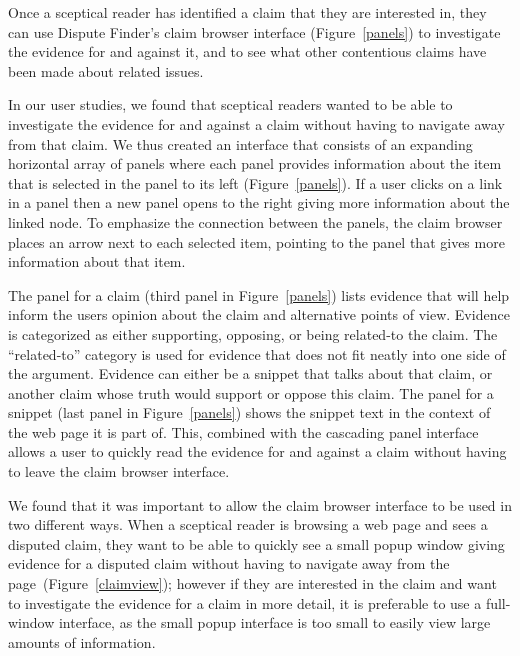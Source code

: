 \documentclass{www2010-submission}
\newcommand{\todo}[1]{}
\begin{document}
Once a sceptical reader has identified a claim that they are interested in, they can use Dispute Finder's claim browser interface (Figure~\ref{panels}) to investigate the evidence for and against it, and to see what other contentious claims have been made about related issues. 

In our user studies, we found that sceptical readers wanted to be able to investigate the evidence for and against a claim without having to navigate away from that claim. We thus created an interface that consists of an expanding horizontal array of panels where each panel provides information about the item that is selected in the panel to its left (Figure~\ref{panels}). If a user clicks on a link in a panel then a new panel opens to the right giving more information about the linked node. To emphasize the connection between the panels, the claim browser places an arrow next to each selected item, pointing to the panel that gives more information about that item.

The panel for a claim (third panel in Figure~\ref{panels}) lists evidence that will help inform the users opinion about the claim and alternative points of view. Evidence is categorized as either supporting, opposing, or being related-to the claim. The ``related-to'' category is used for evidence that does not fit neatly into one side of the argument. Evidence can either be a snippet that talks about that claim, or another claim whose truth would support or oppose this claim.  The panel for a snippet (last panel in Figure~\ref{panels}) shows the snippet text in the context of the web page it is part of. This, combined with the cascading panel interface allows a user to quickly read the evidence for and against a claim without having to leave the claim browser interface.

\todo{Remove ``related`` from the topics list - confuses with related claims}
\todo{Show the other panels?}


We found that it was important to allow the claim browser interface to be used in two different ways. When a sceptical reader is browsing a web page and sees a disputed claim, they want to be able to quickly see a small popup window giving evidence for a disputed claim without having to navigate away from the page~(Figure~\ref{claimview}); however if they are interested in the claim and want to investigate the evidence for a claim in more detail, it is preferable to use a full-window interface, as the small popup interface is too small to easily view large amounts of information.
\end{document}

